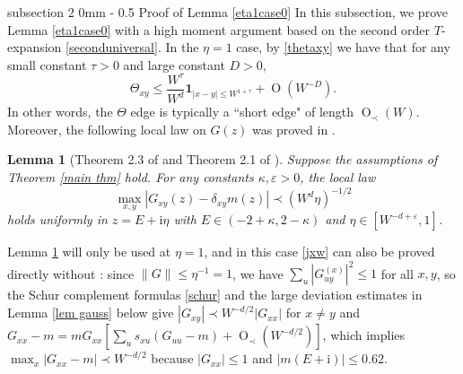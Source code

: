 \documentclass{article}
\makeatletter
\newcommand{\1}{\mathds{1}}
\numberwithin{equation}{section}
\newcommand{\al}{\alpha}
\newcommand{\be}{\begin{equation}}
\newcommand{\ee}{\end{equation}}
\newcommand{\e}{{\varepsilon}}
\newcommand{\ii}{\mathrm{i}} %
\renewcommand{\leq}{\leqslant}
\renewcommand{\le}{\leq}
\DeclareMathOperator{\OO}{O}
\theoremstyle{plain} %
\newtheorem{lemma}[theorem]{Lemma}
\theoremstyle{remark}
\renewcommand{\subsection}{\@startsection
	{subsection}%
	{2}%
	{0mm}%
	{-\baselineskip}%
	{0.5\baselineskip}%
	{\normalfont\bf\itshape}} %
\makeatother
\begin{document}
\subsection{Proof of Lemma \ref{eta1case0}}\label{sec eta1}
In this subsection, we prove Lemma \ref{eta1case0} with a high moment argument based on the second order $T$-expansion \eqref{seconduniversal}.
In the $\eta=1$ case,
 by \eqref{thetaxy} we have that for any small constant $\tau>0$ and large constant $D>0$,
 \be\label{thetaxy eta1}\Theta_{xy}\le \frac{W^\tau}{W^d}\mathbf 1_{|x-y|\le W^{1+\tau}}+ \OO(W^{-D}).\ee
In other words, the $\Theta$ edge is typically a ``short edge" of length $\OO_\prec(W)$. Moreover, the following local law on $G(z)$ was proved in \cite{ErdYauYin2012Univ,Semicircle}.
\begin{lemma}[Theorem 2.3 of \cite{Semicircle} and Theorem 2.1 of \cite{ErdYauYin2012Univ}]\label{semicircle}
Suppose the assumptions of Theorem \ref{main thm} hold. For any constants $\kappa, \e >0$, the local law
\be\label{jxw}
\max_{x,y}|G_{xy}(z) - \delta_{xy}m(z)| \prec ( W^d\eta)^{-1/2}
 \ee
 holds uniformly in $z=E+\ii \eta$ with $E\in (-2+\kappa, 2- \kappa)$ and $\eta \in[W^{-d+\e},1]$.
\end{lemma}

Lemma \ref{semicircle} will only be used at $\eta=1$, and in this case \eqref{jxw} can also be proved directly without \cite{ErdYauYin2012Univ,Semicircle}: since $\|G\|\le \eta^{-1}=1$, we have $\sum_{u}|G^{(x)}_{uy}|^2\le 1$ for all $x,y$, so the Schur complement formulas \eqref{schur} and the large deviation estimates in Lemma \ref{lem gauss} below give $|G_{xy}|\prec W^{-d/2}|G_{xx}|$ for $x\ne y$ and $G_{xx}-m=mG_{xx}[\sum_u s_{xu}(G_{uu}-m)+\OO_\prec(W^{-d/2})]$, which implies $\max_x|G_{xx}-m|\prec W^{-d/2}$ because $|G_{xx}|\le 1$ and $|m(E+\ii)|\le 0.62$.
\end{document}
